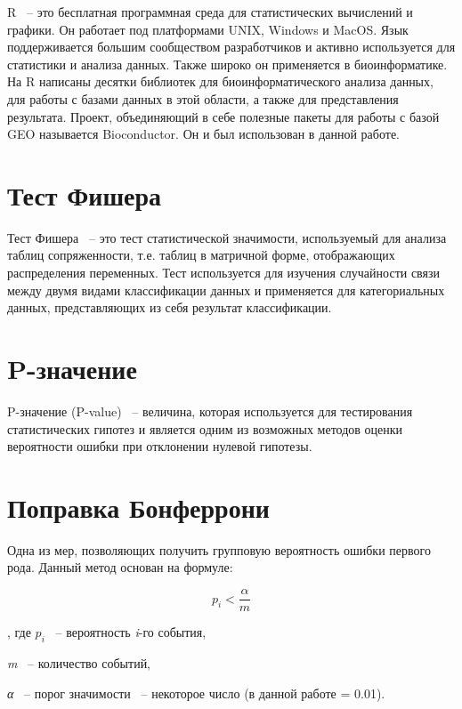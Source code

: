 \documentclass[times,specification,annotation]{itmo-student-thesis}
\begin{document}
R ~-- это бесплатная программная среда для статистических вычислений и графики.\cite{R} Он работает под платформами UNIX, Windows и MacOS. Язык поддерживается большим сообществом разработчиков и активно используется для статистики и анализа данных. Также широко он применяется в биоинформатике. На R написаны десятки библиотек для биоинформатического анализа данных, для работы с базами данных в этой области, а также для представления результата. Проект, объединяющий в себе полезные пакеты для работы с базой GEO называется Bioconductor. Он и был использован в данной работе.

\section{Тест Фишера}

Тест Фишера ~-- это тест статистической значимости, используемый для анализа таблиц сопряженности, т.е. таблиц в матричной форме, отображающих распределения переменных.\cite{Fisher} Тест используется для изучения случайности связи между двумя видами классификации данных и применяется для категориальных данных, представляющих из себя результат классификации.

\section{P-значение}

P-значение (P-value) ~-- величина, которая используется для тестирования статистических гипотез и является одним из возможных методов оценки вероятности ошибки при отклонении нулевой гипотезы.

\section{Поправка Бонферрони}

Одна из мер, позволяющих получить групповую вероятность ошибки первого рода. Данный метод основан на формуле: 

\begin{equation}
\label{bonferroni}
    p_{i} < \frac{\alpha }{m}
\end{equation}

, где \begin{math}p_i\end{math} ~-- вероятность \textit{i}-го события, 

\textit{m} ~-- количество событий,

\textit{α} ~-- порог значимости ~-- некоторое число (в данной работе = 0.01).
\end{document}
